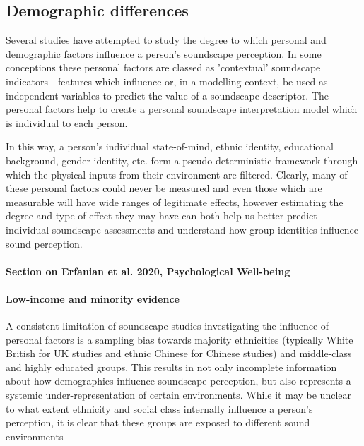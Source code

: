 \subsection{Demographic differences}
Several studies have attempted to study the degree to which personal and demographic factors influence a person's soundscape perception. In some conceptions  %
these personal factors are classed as 'contextual' soundscape indicators - features which influence or, in a modelling context, be used as independent variables to predict the value of a soundscape descriptor. The personal factors help to create a personal soundscape interpretation model which is individual to each person.

In this way, a person's individual state-of-mind, ethnic identity, educational background, gender identity, etc. form a pseudo-deterministic framework %
through which the physical inputs from their environment are filtered. Clearly, many of these personal factors could never be measured and even those which are measurable will have wide ranges of legitimate effects, however estimating the degree and type of effect they may have can both help us better predict individual soundscape assessments and understand how group identities influence sound perception.


\paragraph*{Section on Erfanian et al. 2020, Psychological Well-being}

\paragraph*{Low-income and minority evidence} %
A consistent limitation of soundscape studies investigating the influence of personal factors is a sampling bias towards majority ethnicities (typically White British for UK studies and ethnic Chinese for Chinese studies) and middle-class and highly educated groups. %
This results in not only incomplete information about how demographics influence soundscape perception, but also represents a systemic under-representation of certain environments. While it may be unclear to what extent ethnicity and social class internally influence a person's perception, it is clear that these groups are exposed to different sound environments %

